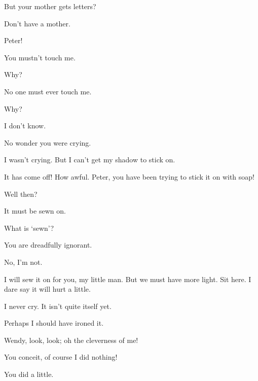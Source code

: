 \begin{drama}
\wendyspeaks
But your mother gets letters?

\peterspeaks
Don’t have a mother.

\wendyspeaks
Peter!


\peterspeaks
You mustn’t touch me.

\wendyspeaks
Why?

\peterspeaks
No one must ever touch me.

\wendyspeaks
Why?

\peterspeaks
I don’t know.


\wendyspeaks
No wonder you were crying.

\peterspeaks
I wasn’t crying.
But I can’t get my shadow to stick on.

\wendyspeaks
It has come off!
How awful.
Peter, you have been trying to stick it on with soap!

Well then?

\wendyspeaks
It must be sewn on.

\peterspeaks
What is ‘sewn’?

\wendyspeaks
You are dreadfully ignorant.

\peterspeaks
No, I’m not.

\wendyspeaks
I will sew it on for you, my little man.
But we must have more light.
Sit here.
I dare say it will hurt a little.

I never cry.
It isn’t quite itself yet.

\wendyspeaks
Perhaps I should have ironed it.

\peterspeaks
Wendy, look, look; oh the cleverness of me!

\wendyspeaks
You conceit, of course I did nothing!

\peterspeaks
You did a little.


\end{drama}
